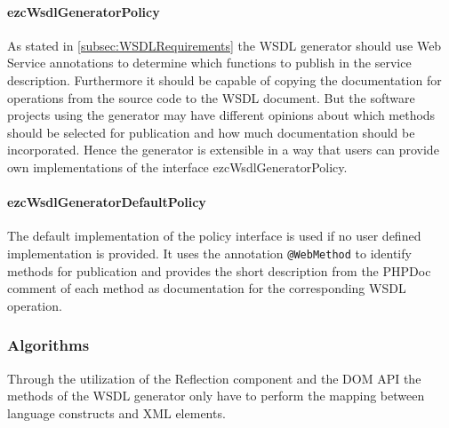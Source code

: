\documentclass[10pt,final,a4paper,oneside]{article}
\begin{document}
\paragraph{ezcWsdlGeneratorPolicy}
As stated in \ref{subsec:WSDLRequirements}
the WSDL generator should
use Web Service annotations
to determine which functions to publish
in the service description.
Furthermore it should be capable of
copying the documentation for operations
from the source code to the WSDL document.
But the software projects using the generator
may have different opinions about
which methods should be selected for publication
and how much documentation should be incorporated.
Hence the generator is extensible in a way
that users can provide own implementations of the
interface ezcWsdlGeneratorPolicy.

\paragraph{ezcWsdlGeneratorDefaultPolicy}
The default implementation of the policy interface
is used if no user defined implementation is provided.
It uses the annotation \verb|@WebMethod|
to identify methods for publication and
provides the short description from the PHPDoc comment
of each method as documentation for
the corresponding WSDL operation.




\subsubsection{Algorithms}
Through the utilization of the Reflection component
and the DOM API the methods of the WSDL generator
only have to perform the mapping between
language constructs and XML elements.
\end{document}
